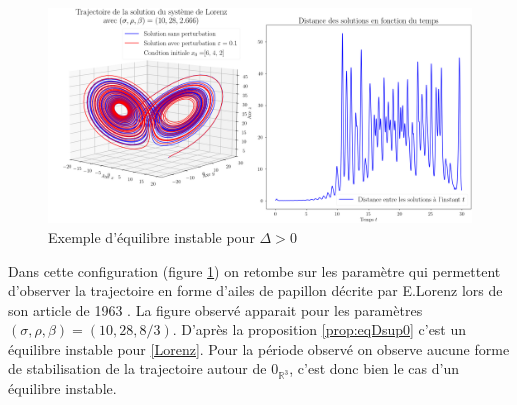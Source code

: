 \documentclass{article}
\newcommand{\R}{\mathbb{R}}
\newtheorem[M , nocut]{prop}{Proposition}[section]
\newtheorem[M , nocut]{definition}{Définition}
\newtheorem[M , nocut]{lemme}{Lemme}
\newtheorem[L , nocut]{thm}{Théoreme}
\newtheorem[M , nocut]{cor}{Corollaire}
\begin{document}
\begin{figure}[!ht]
    \centering
    \includegraphics[width = \textwidth]{EqINS-Dsup0}
    \caption{Exemple d'équilibre instable pour $\Delta>0$}
    \label{fig:EqINS-Dsup0}
\end{figure}
Dans cette configuration (figure \ref{fig:EqINS-Dsup0}) on retombe sur les paramètre qui permettent d'observer la trajectoire en forme d'ailes de papillon décrite par E.Lorenz lors de son article de 1963 \cite{edward_n_lorenz_deterministic_1963}. La figure observé apparait pour les paramètres $(\sigma,\rho,\beta) = (10,28,8/3)$. D'après la proposition \ref{prop:eqDsup0} c'est un équilibre instable pour \eqref{Lorenz}. Pour la période observé on observe aucune forme de stabilisation de la trajectoire autour de $0_{\R^3}$, c'est donc bien le cas d'un équilibre instable.
\end{document}
